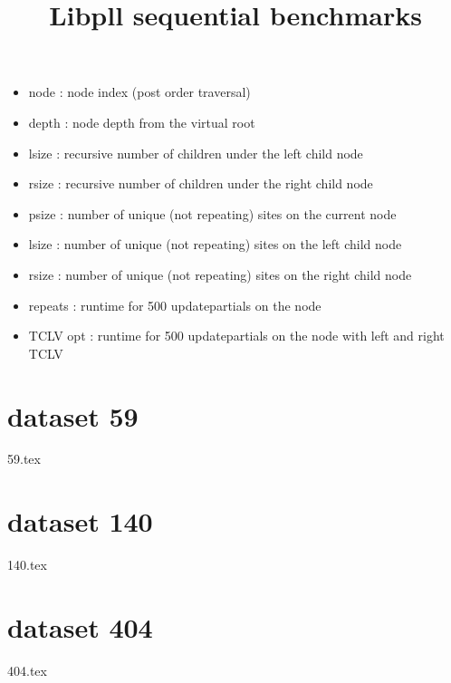 \documentclass[a4paper]{article}
\begin{document}
\newcommand*{\figuretitle}[1]{%
    {\centering%
    \textbf{#1}%
    \par\medskip}%
}


\title{Libpll sequential benchmarks}
\maketitle


\begin{itemize}
\item node : node index (post order traversal)
\item depth : node depth from the virtual root
\item lsize : recursive number of children under the left child node
\item rsize : recursive number of children under the right child node
\item psize : number of unique (not repeating) sites on the current node
\item lsize : number of unique (not repeating) sites on the left child node
\item rsize : number of unique (not repeating) sites on the right child node
\item repeats : runtime for 500 updatepartials on the node
\item TCLV opt : runtime for 500 updatepartials on the node with left and right TCLV
\end{itemize}

\section{dataset 59}
{59.tex}
%
%
\section{dataset 140}
{140.tex}
%
%
\section{dataset 404}
{404.tex}
\end{document}
